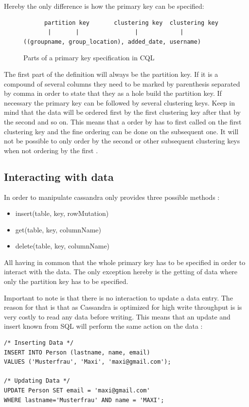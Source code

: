 Hereby the only difference is how the primary key can be specified:
\begin{figure}[ht]
    \centering
\begin{verbatim}
      partition key       clustering key  clustering key
       |       |                |            |
((groupname, group_location), added_date, username)
\end{verbatim}
    \caption{Parts of a primary key specification in CQL \autocite{cqlPrimaryKeyDefinition}}
    \label{fig:cassandra:primaryKeyDefinition}
\end{figure}
The first part of the definition will always be the partition key. If it is a compound of several columns they need to be marked by parenthesis separated by comma in order to state that they as a hole build the partition key. If necessary the primary key can be followed by several clustering keys. Keep in mind that the data will be ordered first by the first clustering key after that by the second and so on. This means that a order by has to first called on the first clustering key and the fine ordering can be done on the subsequent one. It will not be possible to only order by the second or other subsequent clustering keys when not ordering by the first \autocite{cqlPrimaryKeyDefinition, cassandra3cqldocCreateTable}.

\subsection{Interacting with data}
In order to manipulate cassandra only provides three possible methods \autocite{cassandra_paper}:
\begin{itemize}
    \item insert(table, key, rowMutation)
    \item get(table, key, columnName)
    \item delete(table, key, columnName)
\end{itemize}
All having in common that the whole primary key has to be specified in order to interact with the data. The only exception hereby is the getting of data where only the partition key has to be specified.

Important to note is that there is no interaction to update a data entry. The reason for that is that as Cassandra is optimized for high write throughput is is very costly to read any data before writing. This means that an update and insert known from SQL will perform the same action on the data \autocite{cqlAlexMeng, newInCQL3}:
\begin{verbatim}
/* Inserting Data */
INSERT INTO Person (lastname, name, email)
VALUES ('Musterfrau', 'Maxi', 'maxi@gmail.com');

/* Updating Data */
UPDATE Person SET email = 'maxi@gmail.com'
WHERE lastname='Musterfrau' AND name = 'MAXI';
\end{verbatim}

